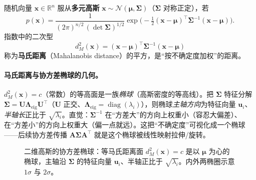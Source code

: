\begin{definition}[多元高斯]\label{def:gauss-nd}
随机向量 $\mathbf{x}\in\mathbb{R}^n$ 服从\textbf{多元高斯} $\mathbf{x}\sim\mathcal{N}(\boldsymbol{\mu},\boldsymbol{\Sigma})$（$\boldsymbol{\Sigma}$ 对称正定），若
\begin{equation}
  p(\mathbf{x})=\frac{1}{(2\pi)^{n/2}\,(\det\boldsymbol{\Sigma})^{1/2}}\exp\!\Big(\!-\tfrac12(\mathbf{x}-\boldsymbol{\mu})^\top\boldsymbol{\Sigma}^{-1}(\mathbf{x}-\boldsymbol{\mu})\Big).
  \label{eq:gauss-nd}
\end{equation}
指数中的二次型
\begin{equation}
  d_M^2(\mathbf{x})=(\mathbf{x}-\boldsymbol{\mu})^\top\boldsymbol{\Sigma}^{-1}(\mathbf{x}-\boldsymbol{\mu})
  \label{eq:mahalanobis}
\end{equation}
称为\textbf{马氏距离}（Mahalanobis distance）的平方，是“按不确定度加权”的距离。
\end{definition}

\paragraph{马氏距离与协方差椭球的几何。}
$d_M^2(\mathbf{x})=c$（常数）的等高面是一族\emph{椭球}（高斯密度的等高线）。把 $\boldsymbol{\Sigma}$ 特征分解 $\boldsymbol{\Sigma}=\mathbf{U}\boldsymbol{\Lambda}_{\!\mathrm{eig}}\mathbf{U}^\top$（$\mathbf{U}$ 正交、$\boldsymbol{\Lambda}_{\!\mathrm{eig}}=\operatorname{diag}(\lambda_i)$），则椭球\emph{主轴方向}为特征向量 $\mathbf{u}_i$、\emph{半轴长}正比于 $\sqrt{\lambda_i}$。直觉：$\boldsymbol{\Sigma}^{-1}$ 在“方差大”的方向上权重小（容忍大偏差）、在“方差小”的方向上权重大（偏一点就远）。这把“不确定度”可视化成一个椭球——后续协方差传播 $\mathbf{A}\boldsymbol{\Sigma}\mathbf{A}^\top$ 就是这个椭球被线性映射拉伸/旋转。

\begin{figure}[ht]
\centering
{}
\caption{二维高斯的协方差椭球：等马氏距离面 $d_M^2(\mathbf{x})=c$ 是以 $\boldsymbol{\mu}$ 为心的椭球，主轴沿 $\boldsymbol{\Sigma}$ 的特征向量 $\mathbf{u}_i$、半轴正比于 $\sqrt{\lambda_i}$。内外两椭圈示意 $1\sigma$ 与 $2\sigma$。}
\label{fig:cov-ellipse}
\end{figure}

